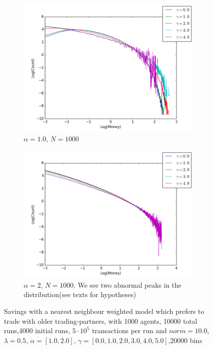 \documentclass[a4paper,11pt]{article}
\begin{document}
{\begin{figure}[H]
	\centering
	\begin{subfigure}[t]{0.45\textwidth}
		\includegraphics[scale=0.4]{historic_lambda=0_5_alpha=1}
		\caption{$\alpha = 1.0$, $N=1000$}
		\label{fig:historic_lambda=0_5_alpha=1}
	\end{subfigure}
	\begin{subfigure}[t]{0.45\textwidth}
		\includegraphics[scale=0.4]{historic_lambda=0_5_alpha=2}
		\caption{$\alpha = 2$, $N=1000$. We see two abnormal peaks in the distribution(see texts for hypotheses)}
		\label{fig:historic_lambda=0_5_alpha=2}
	\end{subfigure}
	\caption{Savings with a nearest neighbour weighted model which prefers to trade with older trading-partners, with 1000 agents, 10000 total runs,4000 initial runs,  $5\cdot 10^{5}$ transactions per run and  $norm=10.0$,$\lambda=0.5$, $\alpha=[1.0,2.0]$, $\gamma=[0.0,1.0,2.0,3.0,4.0,5.0]$,20000 bins}
	\label{fig:history_lambda=0_5}
\end{figure}


}
\end{document}
